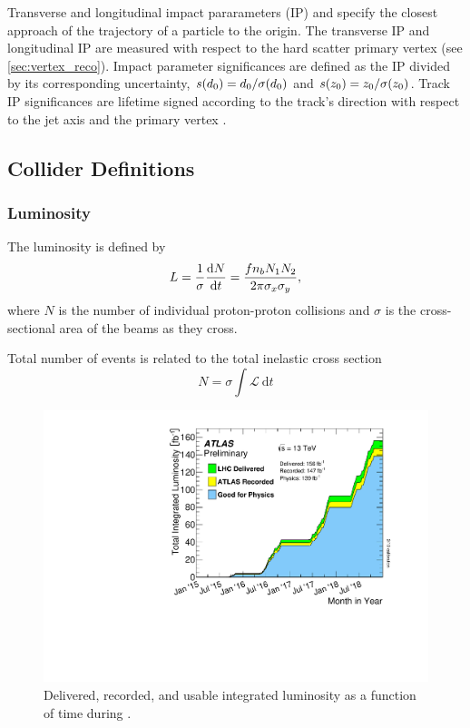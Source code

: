 Transverse and longitudinal impact pararameters (IP) \dzero and \zzero specify the closest approach of the trajectory of a particle to the origin.
The transverse IP \dzero and longitudinal IP \zzero are measured with respect to the hard scatter primary vertex (see \cref{sec:vertex_reco}).
Impact parameter significances are defined as the IP divided by its corresponding uncertainty, $s(d_0) = d_0 / \sigma(d_0)$ and $s(z_0) = z_0 / \sigma(z_0)$.
Track IP significances are lifetime signed according to the track's direction with respect to the jet axis and the primary vertex \cite{PERF-2012-04}.



\subsection{Collider Definitions}\label{sec:collider_defs}

\subsubsection{Luminosity}
The luminosity is defined by
%
\begin{equation}\label{eq:lumi_def}
L = \frac{1}{\sigma} \frac{\mathrm{d}N}{\mathrm{d}t} = \frac{f n_b N_1 N_2}{2 \pi \sigma_x \sigma_y},
\end{equation}
%
where $N$ is the number of individual proton-proton collisions and $\sigma$ is the cross-sectional area of the beams as they cross.

Total number of events is related to the total inelastic cross section
%
\begin{equation}
 N = \sigma \int \mathcal{L} ~\mathrm{d}t 
\end{equation}
%

%
\begin{figure}[!htbp]
  \centering
  \includegraphics[width=0.6\linewidth]{chapters/2.detector/figs/intlumivstimeRun2DQall.pdf}
  \caption{
    Delivered, recorded, and usable integrated luminosity as a function of time during \runtwo \cite{atlas-lumi-run2}.
  }
  \label{fig:run2_lumi}
\end{figure}
%


